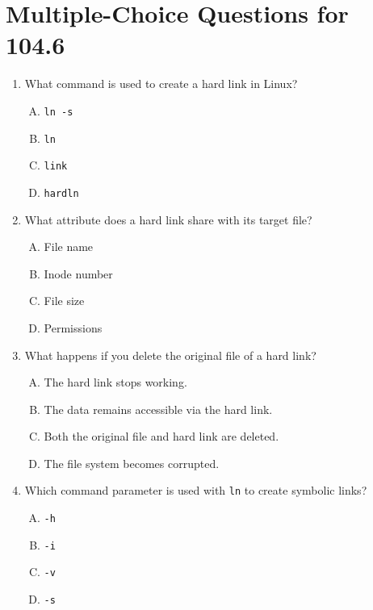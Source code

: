 \documentclass[a4paper]{report}
\begin{document}
\section*{Multiple-Choice Questions for 104.6}
\begin{enumerate}[1.]

    \item What command is used to create a hard link in Linux?  
    \begin{enumerate}[A)]
        \item \texttt{ln -s}  
        \item \texttt{ln}  
        \item \texttt{link}  
        \item \texttt{hardln}  
    \end{enumerate}

    \item What attribute does a hard link share with its target file?  
    \begin{enumerate}[A)]
        \item File name  
        \item Inode number  
        \item File size  
        \item Permissions  
    \end{enumerate}

    \item What happens if you delete the original file of a hard link?  
    \begin{enumerate}[A)]
        \item The hard link stops working.  
        \item The data remains accessible via the hard link.  
        \item Both the original file and hard link are deleted.  
        \item The file system becomes corrupted.  
    \end{enumerate}

    \item Which command parameter is used with \texttt{ln} to create symbolic links?  
    \begin{enumerate}[A)]
        \item \texttt{-h}  
        \item \texttt{-i}  
        \item \texttt{-v}  
        \item \texttt{-s}  
    \end{enumerate}


\end{enumerate}
\end{document}

